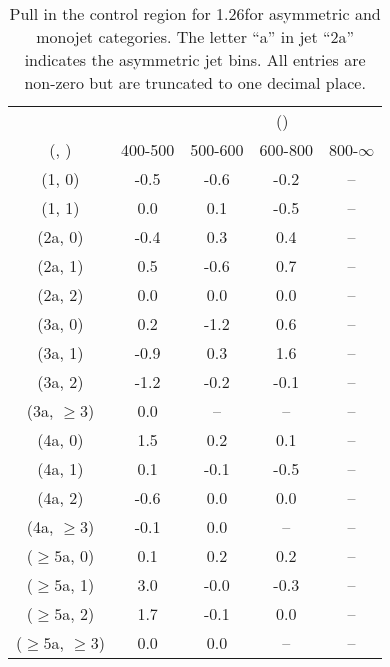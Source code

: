 \begin{table}[h!]
\tiny
\centering
\caption{Pull in the \gj control region for 1.26\ifb for asymmetric and monojet categories. The letter ``a'' in jet \eg ``2a''  indicates the asymmetric jet bins. All entries are non-zero but are truncated to one decimal place.\label{tab:pullsep_ewk_gj_asym}}
\begin{tabular}
{ccccc}
	\hline\hline
&	& \multicolumn{4}{c}{\scalht (\gev)} \\ 
	 (\njet,  \nb) & 400-500 & 500-600 & 600-800 & 800-$\infty$ \\ [0.8ex] 
\hline
	(1, 0) & -0.5 & -0.6 & -0.2 & -- \\[0.5ex] 
	(1, 1) & 0.0 & 0.1 & -0.5 & -- \\[0.5ex] 
	(2a, 0) & -0.4 & 0.3 & 0.4 & -- \\[0.5ex] 
	(2a, 1) & 0.5 & -0.6 & 0.7 & -- \\[0.5ex] 
	(2a, 2) & 0.0 & 0.0 & 0.0 & -- \\[0.5ex] 
	(3a, 0) & 0.2 & -1.2 & 0.6 & -- \\[0.5ex] 
	(3a, 1) & -0.9 & 0.3 & 1.6 & -- \\[0.5ex] 
	(3a, 2) & -1.2 & -0.2 & -0.1 & -- \\[0.5ex] 
	(3a, $\ge3$) & 0.0 & -- & -- & -- \\[0.5ex] 
	(4a, 0) & 1.5 & 0.2 & 0.1 & -- \\[0.5ex] 
	(4a, 1) & 0.1 & -0.1 & -0.5 & -- \\[0.5ex] 
	(4a, 2) & -0.6 & 0.0 & 0.0 & -- \\[0.5ex] 
	(4a, $\ge3$) & -0.1 & 0.0 & -- & -- \\[0.5ex] 
	($\ge5$a, 0) & 0.1 & 0.2 & 0.2 & -- \\[0.5ex] 
	($\ge5$a, 1) & 3.0 & -0.0 & -0.3 & -- \\[0.5ex] 
	($\ge5$a, 2) & 1.7 & -0.1 & 0.0 & -- \\[0.5ex] 
	($\ge5$a, $\ge3$) & 0.0 & 0.0 & -- & -- \\[0.5ex] 
	\hline
	\hline
\end{tabular}
\end{table}
